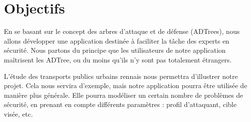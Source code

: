 \section{Objectifs}
	\label{sec:objectifs}

	En se basant sur le concept des arbres d’attaque et de défense (ADTrees), nous allons développer une application destinée à faciliter la tâche des experts en sécurité. Nous partons du principe que les utilisateurs de notre application maîtrisent les ADTree, ou du moins qu’ils n’y sont pas totalement étrangers.

	L’étude des transports publics urbains rennais nous permettra d’illustrer notre projet. Cela nous servira d’exemple, mais notre application pourra être utilisée de manière plus générale. Elle pourra modéliser un certain nombre de problèmes de sécurité, en prenant en compte différents paramètres : profil d’attaquant, cible visée, etc.
